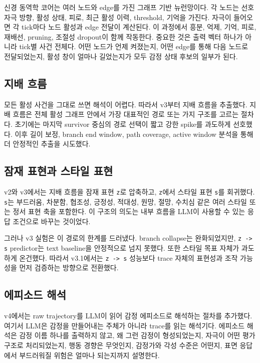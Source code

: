 \documentclass[11pt,a4paper]{article}
\newcommand{\eng}[1]{\texttt{#1}}
\begin{document}
신경 동역학 코어는 여러 노드와 edge를 가진 그래프 기반 뉴런망이다. 각 노드는 선호 자극 방향, 활성 상태, 피로, 최근 활성 이력, threshold, 기억을 가진다. 자극이 들어오면 각 tick마다 노드 활성과 edge 전달이 계산된다. 이 과정에서 흥분, 억제, 기억, 피로, 재배선, pruning, 조절성 dropout이 함께 작동한다. 중요한 것은 출력 벡터 하나가 아니라 tick별 사건 전체다. 어떤 노드가 언제 켜졌는지, 어떤 edge를 통해 다음 노드로 전달되었는지, 활성 창이 얼마나 길었는지가 모두 감정 상태 후보의 일부가 된다.

\subsection{지배 흐름}

모든 활성 사건을 그대로 쓰면 해석이 어렵다. 따라서 v3부터 지배 흐름을 추출했다. 지배 흐름은 전체 활성 그래프 안에서 가장 대표적인 경로 또는 가지 구조를 고르는 절차다. 초기에는 마지막 survivor 중심의 경로 선택이 짧고 강한 spike를 과도하게 선호했다. 이후 길이 보정, branch end window, path coverage, active window 분석을 통해 더 안정적인 추출을 시도했다.

\subsection{잠재 표현과 스타일 표현}

v2와 v3에서는 지배 흐름을 잠재 표현 \eng{z}로 압축하고, \eng{z}에서 스타일 표현 \eng{s}를 회귀했다. \eng{s}는 부드러움, 차분함, 협조성, 긍정성, 적대성, 원망, 절망, 수치심 같은 여러 스타일 또는 정서 표현 축을 포함한다. 이 구조의 의도는 내부 흐름을 LLM이 사용할 수 있는 응답 조건으로 바꾸는 것이었다.

그러나 v3 실험은 이 경로의 한계를 드러냈다. branch collapse는 완화되었지만, \eng{z -> s} predictor는 text baseline을 안정적으로 넘지 못했다. 또한 스타일 목표 자체가 과도하게 온건했다. 따라서 v3.1에서는 \eng{z -> s} 성능보다 trace 자체의 표현성과 조작 가능성을 먼저 검증하는 방향으로 전환했다.

\subsection{에피소드 해석}

v4에서는 raw trajectory를 LLM이 읽어 감정 에피소드로 해석하는 절차를 추가했다. 여기서 LLM은 감정을 만들어내는 주체가 아니라 trace를 읽는 해석기다. 에피소드 해석은 감정 이름 하나를 출력하지 않고, 왜 그런 감정이 형성되었는지, 자극이 어떤 평가 구조로 처리되었는지, 행동 경향은 무엇인지, 감정가와 각성 수준은 어떤지, 표면 응답에서 부드러워질 위험은 얼마나 되는지까지 설명한다.
\end{document}
